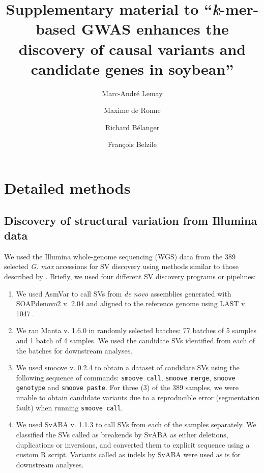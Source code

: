\documentclass[12pt]{article}
\title{Supplementary material to ``\textit{k}-mer-based GWAS enhances the discovery of causal variants and candidate genes in soybean''}
\date{}
\author{Marc-André Lemay \and
Maxime de Ronne \and
Richard Bélanger \and
François Belzile}
\begin{document}
\maketitle

\renewcommand\thefigure{S\arabic{figure}} 
\setcounter{figure}{0}
\setcounter{table}{0}
\renewcommand\thetable{S\arabic{table}} 

\newcommand{\getvar}[1]{\DTLfetch{variables}{key}{#1}{value}}

\setcounter{page}{1}

\section*{Detailed methods}
\label{annexe-sv-gwas-detailed-methods}

\subsection*{Discovery of structural variation from Illumina data}
\label{sv-gwas-sv-discovery-illumina}

We used the Illumina whole-genome sequencing (WGS) data from the 389 selected \emph{G. max} accessions
for SV discovery using methods similar to those described by
.  Briefly, we used four different SV discovery programs or
pipelines: 

\begin{enumerate}

\item We used AsmVar  to call SVs
	from \emph{de novo} assemblies generated with SOAPdenovo2 v. 2.04
		 and aligned to the reference genome using LAST
		v. 1047 .
\item We ran Manta v. 1.6.0  in randomly selected batches: 77 batches of
	5 samples and 1 batch of 4 samples. We used the candidate SVs
		identified from each of the batches for downstream analyses.
\item We used smoove v. 0.2.4  to obtain a dataset of candidate SVs
	using the following sequence of commands:
	\texttt{smoove call}, \texttt{smoove merge}, \texttt{smoove
		genotype} and \texttt{smoove paste}.
		For three (3) of the 389 samples, we were unable
		to obtain candidate variants due to a reproducible
		error (segmentation fault) when running \texttt{smoove
		call}.
	\item We used SvABA v. 1.1.3  to call SVs from each of the
	samples separately. We classified the SVs called as breakends by SvABA
		as either deletions, duplications or inversions, and converted
		them to explicit sequence using a custom R script. Variants
		called as indels by SvABA were used as is for downstream
		analyses.
\end{enumerate}
\end{document}
